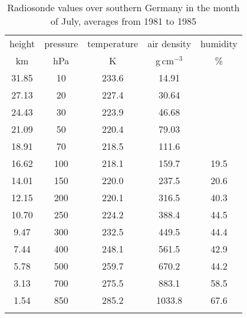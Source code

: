 \documentclass[agp]{svjour}
\begin{document}
\begin{appendix}
\begin{table}[b]
\caption[]{Radiosonde values over southern Germany in the month of July,
averages from 1981 to 1985}
\begin{tabular*}{84.22mm}{@{\hspace{0pt}\extracolsep{\fill}}ccccc@{\hspace{0pt}}}
\hline
\noalign{\smallskip}
height & pressure & temperature & air density &
humidity \\ km & hPa & K & g\,cm$^{-3}$ & \% \\
\noalign{\smallskip}
\hline
\noalign{\smallskip}
31.85 & \phantom{1}10 & 233.6 & 14.91 & \\
27.13 & \phantom{1}20 & 227.4 & 30.64 & \\
24.43 & \phantom{1}30 & 223.9 & 46.68 & \\
21.09 & \phantom{1}50 & 220.4 & 79.03 & \\
18.91 & \phantom{1}70 & 218.5 & 111.6 & \\
16.62 & 100 & 218.1 & 159.7 & 19.5 \\
14.01 & 150 & 220.0 & 237.5 & 20.6 \\
12.15 & 200 & 220.1 & 316.5 & 40.3 \\
10.70 & 250 & 224.2 & 388.4 & 44.5 \\
\phantom{1}9.47 & 300 & 232.5 & 449.5 & 44.4 \\
\phantom{1}7.44 & 400 & 248.1 & 561.5 & 42.9 \\
\phantom{1}5.78 & 500 & 259.7 & 670.2 & 44.2 \\
\phantom{1}3.13 & 700 & 275.5 & 883.1 & 58.5 \\
\phantom{1}1.54 & 850 & 285.2 & 1033.8 & 67.6\\
\noalign{\smallskip}
\hline
\end{tabular*}
\label{tab:9}
\end{table}


\end{appendix}
\end{document}
